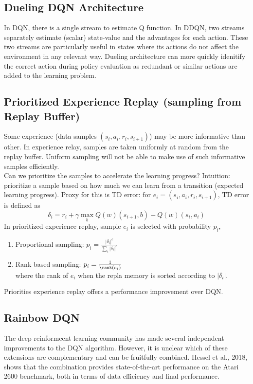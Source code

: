 \subsection{Dueling DQN Architecture} 
In DQN, there is a single stream to estimate Q function. In DDQN, two streams separately estimate (scalar) state-value and the advantages for each action. These two streams are particularly useful in states where its actions do not affect the environment in any relevant way. 
Dueling architecture can more quickly idenitify the correct action during policy evaluation as redundant or similar actions are added to the learning problem.

\subsection{Prioritized Experience Replay (sampling from Replay Buffer)}
Some experience (data samples $(s_i, a_i, r_i, s_{i+1})$) may be more informative than other. In experience relay, samples are taken uniformly at random from the replay buffer. Uniform sampling will not be able to make use of such informative samples efficiently. \\ 

\noindent Can we prioritize the samples to accelerate the learning progress? Intuition: prioritize a sample based on how much we can learn from a transition (expected learning progress). Proxy for this is TD error: for $e_i = (s_i, a_i, r_i, s_{i+1})$, TD error is defined as 
\[
  \delta_i = r_i + \gamma \max_{b}Q(w)(s_{i+1}, b) - Q(w)(s_i, a_i) 
\] 
In prioritized experience replay, sample $e_i$ is selected with probability $p_i$,
\begin{enumerate}[label=\textbf{--}, topsep=5pt, itemsep=-5pt]
  \item Proportional sampling: $p_i = \frac{|\delta_i|^c}{\sum_{i}|\delta_i|^c}$
  \item Rank-based sampling: $p_i = \frac{1}{\rank(e_i)}$ \\ 
    where the rank of $e_i$ when the repla memory is sorted according to $|\delta_i|$.
\end{enumerate}
Priorities experience replay offers a performance improvement over DQN.
\subsection{Rainbow DQN}
The deep reinformcent learning community has made several independent improvements to the DQN 
algorithm. However, it is unclear which of these extensions are complementary and can be fruitfully combined. 
Hessel et al., 2018,  shows that the combination provides state-of-the-art performance on the Atari 2600 benchmark, both in terms of data efficiency and final performance. 

